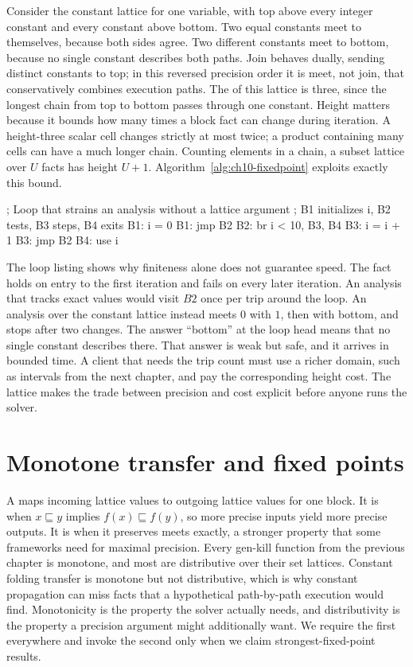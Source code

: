 Consider the constant lattice for one variable, with top above every integer constant and every constant above bottom.
Two equal constants meet to themselves, because both sides agree.
Two different constants meet to bottom, because no single constant describes both paths.
Join behaves dually, sending distinct constants to top; in this reversed precision order it is meet, not join, that conservatively combines execution paths.
The  of this lattice is three, since the longest chain from top to bottom passes through one constant.
Height matters because it bounds how many times a block fact can change during iteration.
A height-three scalar cell changes strictly at most twice; a product containing many cells can have a much longer chain.
Counting elements in a chain, a subset lattice over $U$ facts has height $U+1$.
Algorithm~\ref{alg:ch10-fixedpoint} exploits exactly this bound.

\begin{irlisting}
; Loop that strains an analysis without a lattice argument
; B1 initializes i, B2 tests, B3 steps, B4 exits
B1: i = 0
B1: jmp B2
B2: br i < 10, B3, B4
B3: i = i + 1
B3: jmp B2
B4: use i
\end{irlisting}

The loop listing shows why finiteness alone does not guarantee speed.
The fact  holds on entry to the first iteration and fails on every later iteration.
An analysis that tracks exact values would visit $B2$ once per trip around the loop.
An analysis over the constant lattice instead meets $0$ with $1$, then with bottom, and stops after two changes.
The answer \enquote{bottom} at the loop head means that no single constant describes  there.
That answer is weak but safe, and it arrives in bounded time.
A client that needs the trip count must use a richer domain, such as intervals from the next chapter, and pay the corresponding height cost.
The lattice makes the trade between precision and cost explicit before anyone runs the solver.

\section{Monotone transfer and fixed points}
\label{sec:ch10-transfer}

A  maps incoming lattice values to outgoing lattice values for one block.
It is  when $x \sqsubseteq y$ implies $f(x) \sqsubseteq f(y)$, so more precise inputs yield more precise outputs.
It is  when it preserves meets exactly, a stronger property that some frameworks need for maximal precision.
Every gen-kill function from the previous chapter is monotone, and most are distributive over their set lattices.
Constant folding transfer is monotone but not distributive, which is why constant propagation can miss facts that a hypothetical path-by-path execution would find.
Monotonicity is the property the solver actually needs, and distributivity is the property a precision argument might additionally want.
We require the first everywhere and invoke the second only when we claim strongest-fixed-point results.

